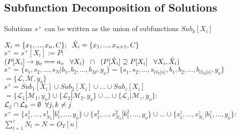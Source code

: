 \documentclass[11pt]{article}
\begin{document}
\subsection{Subfunction Decomposition of Solutions}
Solutions $s^+$ can be written as the union of subfunctions $Sub_k[X_i]$
\begin{center}
$
X_i = \{x_1,...,x_n,C\}; \hspace{2mm} \hat{X}_i = \{x_1,...,x_{n+1},C\}
$
\\ \vspace{2mm}
$
s^+ = s^+[X_i] := P :
$
\\ \vspace{2mm}
$
(P \lbrack X_i \rbrack \rightarrow y_{o} == a_{o} \hspace{3mm} \forall X_i) \hspace{2mm} \cap \hspace{2mm} (P[\hat{X}_i] \supseteq P[X_i] \hspace{3mm} \forall X_i,\hat{X}_i)
$
\\ \vspace{4mm}
$
s^+ = \{ s_1,s_2,...,s_N|b_1,b_2,...,b_M,y_o\} = \{ s_1,s_2,...,s_{O_T \lbrack n \rbrack }, b_1, b_2,...,b_{O_S \lbrack n \rbrack},y_o \}
$
\\ \vspace{2mm}
$
= \{ \mathcal{L},\mathcal{M},y_o\}
$
\\ \vspace{4mm}
$
s^+ = Sub_1[X_i] \cup Sub_2[X_i] \cup ... \cup Sub_z[X_i]
$
\\ \vspace{3mm}
$
= \{ \mathcal{L}_1| \mathcal{M}_1,y_o\} \cup \{  \mathcal{L}_2| \mathcal{M}_2,y_o\} \cup ... \cup \{  \mathcal{L}_z| \mathcal{M}_z,y_o\} : 
$
\\ \vspace{2mm}
$
\mathcal{L}_j \cap \mathcal{L}_k = \emptyset \hspace{2mm} \forall j,k\neq j
$
\\ \vspace{4mm}
$
s^+ = \{ s_{1}^1,...,s^1_{N_1}| b^1_{1},...,y_o\} \cup \{  s_{1}^2,...,s^2_{N_2}| b^2_{1},...,y_o\} \cup ... \cup \{ s_{1}^z,...,s^z_{N_z}| b^z_{1},...,y_o\}:
$
\\ \vspace{2mm}
$
\sum_{l=1}^z N_l = N = O_T[n]
$
\end{center}
\end{document}

